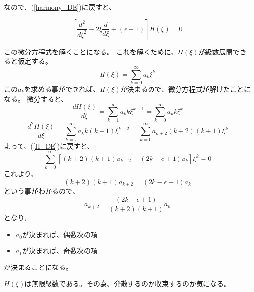 なので、(\ref{harmony_DE})に戻すと、

\begin{equation}
	\label{H_DE}
	\left[\dfrac{d^2}{d\xi^2} -2\xi\dfrac{d}{d\xi} + (\epsilon -1)\right]H(\xi) = 0
\end{equation}

この微分方程式を解くことになる。
これを解くために、$H(\xi)$が級数展開できると仮定する。
\begin{equation}
	H(\xi) = \sum_{k=0}^{\infty}a_k \xi^k
\end{equation}
この$a_k$を求める事ができれば、$H(\xi)$が決まるので、微分方程式が解けたことになる。
微分すると、
\begin{equation}
	\dfrac{d H(\xi)}{d\xi} = \sum_{k=1}^{\infty}a_k k\xi^{k-1} = \sum_{k=0}^{\infty}a_k k\xi^k
\end{equation}
\begin{equation}
	\dfrac{d^2 H(\xi)}{d\xi} = \sum_{k=2}^{\infty}a_k k(k-1)\xi^{k-2} = \sum_{k=0}^{\infty}a_{k+2} (k+2)(k+1)\xi^k
\end{equation}
よって、(\ref{H_DE})に戻すと、
\begin{equation}
	\sum_{k=0}^{\infty} \left[ (k+2)(k+1)a_{k+2} - (2k - \epsilon + 1)a_k  \right] \xi^k = 0
\end{equation}
これより、
\begin{equation}
	(k+2)(k+1)a_{k+2} = (2k - \epsilon + 1)a_k
\end{equation}
という事がわかるので、
\begin{equation}
	\label{recurrence_relation_1}
	a_{k+2} = \dfrac{(2k - \epsilon + 1)}{(k+2)(k+1)}a_k
\end{equation}
となり、
\begin{itemize}
	\item $a_0$が決まれば、偶数次の項
	\item $a_1$が決まれば、奇数次の項
\end{itemize}
が決まることになる。

$H(\xi)$は無限級数である。その為、発散するのか収束するのか気になる。

